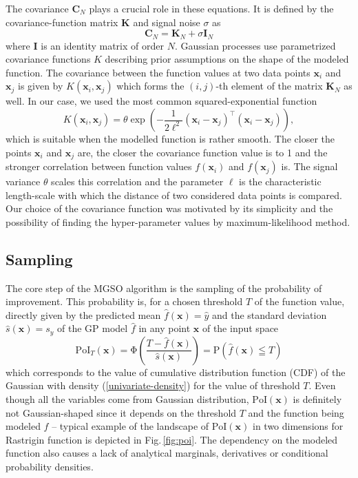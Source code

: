 \documentclass{itatnew}
\newcommand{\xx}{\mathrm{\mathbf{x}}}
\newcommand{\CC}{\mathrm{\mathbf{C}}}
\begin{document}
The covariance $\CC_N$ plays a crucial role in these equations. It is defined by the covariance-function matrix $\mathbf{K}$ and signal noise $\sigma$ as
\begin{equation}
  \CC_N = \mathbf{K}_N + \sigma \mathbf{I}_N
\end{equation}
where $\mathbf{I}$ is an identity matrix of order $N$. Gaussian processes use parametrized covariance functions $K$ describing prior assumptions on the shape of the modeled function. The covariance between the function values at two data points $\xx_i$ and $\xx_j$ is given by $K(\xx_i, \xx_j)$ which forms the $(i,j)$-th element of the matrix $\mathbf{K}_N$ as well. In our case, we used the most common squared-exponential function
\begin{equation}
K(\xx_i, \xx_j) = \theta \exp \left( -\frac{1}{2\ell^2} (\xx_i - \xx_j)^\top(\xx_i - \xx_j) \right), %
\end{equation}
which is suitable when the modelled function is rather smooth. The closer the points $\xx_i$ and $\xx_j$ are, the closer the covariance function value is to 1 and the stronger correlation between function values $f(\xx_i)$ and $f(\xx_j)$ is. The signal variance $\theta$ scales this correlation
and the parameter $\ell$ is the characteristic length-scale with which the distance of two considered data points is compared. Our choice of the covariance function was motivated by its simplicity and the possibility of finding the hyper-parameter values by maximum-likelihood method. 


\subsection{Sampling}
\label{sec:sampling}

The core step of the MGSO algorithm is the sampling of the probability of improvement. This probability is, for a chosen threshold $T$ of the function value, directly given by the predicted mean $\hat{f}(\xx) = \hat{y}$ and the standard deviation $\hat{s}(\xx) = s_{y}$ of the GP model $\hat{f}$ in any point $\xx$ of the input space
\begin{equation}
  \mathrm{PoI}_T(\xx) = \mathrm{\Phi}\left( \frac{T - \hat{f}(\xx)}{\hat{s}(\xx)} \right) = \mathrm{P}(\hat{f}(\xx) \leqq T)
\end{equation}
which corresponds to the value of cumulative distribution function (CDF) of the Gaussian with density (\ref{univariate-density}) for the value of threshold $T$. Even though all the variables come from Gaussian distribution, $\mathrm{PoI}(\xx)$ is definitely not Gaussian-shaped since it depends on the threshold $T$ and the function being modeled $f$ -- typical example of the landscape of $\textrm{PoI}(\xx)$ in two dimensions for Rastrigin function is depicted in Fig.\,\ref{fig:poi}.
The dependency on the modeled function also causes a lack of analytical marginals, derivatives or conditional probability densities.
\end{document}
